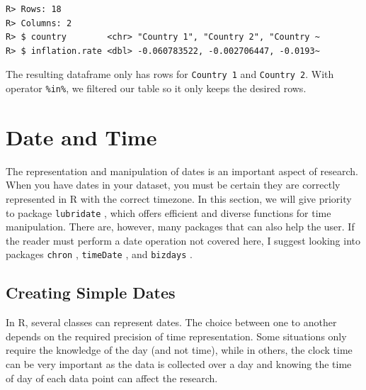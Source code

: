 \documentclass[
  12pt,
]{book}
\newenvironment{Shaded}{\begin{snugshade}}{\end{snugshade}}
\newcommand{\CommentTok}[1]{\textcolor[rgb]{0.37,0.37,0.37}{\textit{#1}}}
\newcommand{\KeywordTok}[1]{\textcolor[rgb]{0.27,0.27,0.27}{\textbf{#1}}}
\newcommand{\NormalTok}[1]{#1}
\newcommand{\OperatorTok}[1]{\textcolor[rgb]{0.43,0.43,0.43}{\textbf{#1}}}
\newcommand{\StringTok}[1]{\textcolor[rgb]{0.5,0.5,0.5}{#1}}
\begin{document}
\begin{Shaded}
\end{Shaded}

\begin{verbatim}
R> Rows: 18
R> Columns: 2
R> $ country        <chr> "Country 1", "Country 2", "Country ~
R> $ inflation.rate <dbl> -0.060783522, -0.002706447, -0.0193~
\end{verbatim}

The resulting dataframe only has rows for \texttt{\textquotesingle{}Country\ 1\textquotesingle{}} and \texttt{\textquotesingle{}Country\ 2\textquotesingle{}}. With operator \texttt{\%in\%}, we filtered our table so it only keeps the desired rows.

\hypertarget{date-and-time}{%
\section{Date and Time}\label{date-and-time}}

The representation and manipulation of dates is an important aspect of research. When you have dates in your dataset, you must be certain they are correctly represented in R with the correct timezone. In this section, we will give priority to package \texttt{lubridate} \citep{R-lubridate}, which offers efficient and diverse functions for time manipulation. There are, however, many packages that can also help the user. If the reader must perform a date operation not covered here, I suggest looking into packages \texttt{chron} \citep{R-chron}, \texttt{timeDate} \citep{R-timeDate}, and \texttt{bizdays} \citep{R-bizdays}.    

\hypertarget{creating-simple-dates}{%
\subsection{Creating Simple Dates}\label{creating-simple-dates}}

In R, several classes can represent dates. The choice between one to another depends on the required precision of time representation. Some situations only require the knowledge of the day (and not time), while in others, the clock time can be very important as the data is collected over a day and knowing the time of day of each data point can affect the research.
\end{document}
